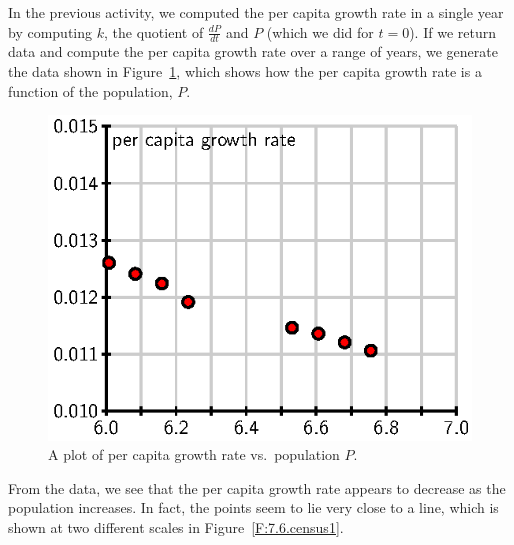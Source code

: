 In the previous activity, we computed the per capita growth rate in a
single year by computing $k$, the quotient of $\frac{dP}{dt}$ and $P$ (which we did for $t = 0$).  If we return data and compute the per capita
growth rate over a range of years, we generate the data shown in Figure~\ref{F:7.6.census}, which shows how the per capita growth rate is a function of the population, $P$.  
\begin{figure}[h]
\begin{center}
  \includegraphics{figures/7_6_census.eps}
\end{center}
\caption{A plot of per capita growth rate vs.~population $P$.} \label{F:7.6.census}
\end{figure}
From the data, we see that the per capita growth rate appears to decrease as
the population increases.  In fact, the points seem to lie very close
to a line, which is shown at two different scales in Figure~\ref{F:7.6.census1}.
